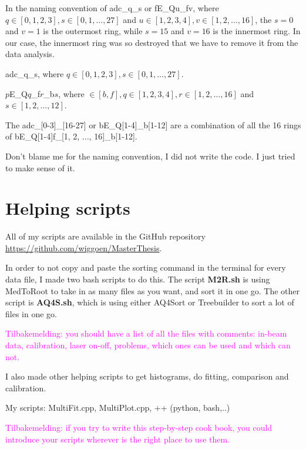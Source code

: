 \documentclass[twoside,english]{uiofysmaster/uiofysmaster}
\begin{document}
In the naming convention of adc\_q\_s or fE\_Qu\_fv, where $q \in [0, 1, 2, 3], s \in [0, 1, \ldots, 27]$ and $u \in [1, 2, 3, 4], v \in [1, 2, \ldots, 16]$, the $s = 0$ and $v = 1$ is the outermost ring, while $s = 15$ and $v = 16$ is the innermost ring. In our case, the innermost ring was so destroyed that we have to remove it from the data analysis.


adc\_q\_s, where $q \in [0, 1, 2, 3], s \in [0, 1, \ldots, 27]$.

$p$E\_Q$q$\_f$r$\_b$s$, where $ \in [b, f], q \in [1, 2, 3, 4], r \in [1, 2, \ldots, 16]$ and $s \in [1, 2, \ldots, 12]$. 

The adc\_[0-3]\_[16-27] or bE\_Q[1-4]\_b[1-12] are a combination of all the 16 rings of bE\_Q[1-4]f\_[1, 2, $\ldots$, 16]\_b[1-12].

Don't blame me for the naming convention, I did not write the code. I just tried to make sense of it.


\begin{table}[ht] 
	\centering 
	
\end{table}



\section{Helping scripts}
All of my scripts are available in the GitHub repository \url{https://github.com/wiggoen/MasterThesis}.

In order to not copy and paste the sorting command in the terminal for every data file, I made two bash scripts to do this. The script \textbf{M2R.sh} is using MedToRoot to take in as many files as you want, and sort it in one go. The other script is \textbf{AQ4S.sh}, which is using either AQ4Sort or Treebuilder to sort a lot of files in one go. 

\textcolor{Magenta}{Tilbakemelding: \newline 
you should have a list of all the files with comments: in-beam data, calibration, laser on-off, problems, which ones can be used and which can not.
}

I also made other helping scripts to get histograms, do fitting, comparison and calibration. 

My scripts: MultiFit.cpp, MultiPlot.cpp, ++ (python, bash,..)

\textcolor{Magenta}{Tilbakemelding: \newline 
if you try to write this step-by-step cook book, you could introduce your scripts wherever is the right place to use them. 
}
\end{document}
